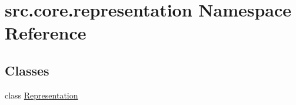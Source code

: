 \hypertarget{namespacesrc_1_1core_1_1representation}{\section{src.\+core.\+representation Namespace Reference}
\label{namespacesrc_1_1core_1_1representation}
}
\subsection*{Classes}
\begin{DoxyCompactItemize}
\item 
class \hyperlink{classsrc_1_1core_1_1representation_1_1_representation}{Representation}
\end{DoxyCompactItemize}
